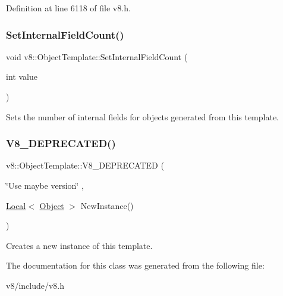 Definition at line 6118 of file v8.\+h.

\mbox{\label{classv8_1_1ObjectTemplate_ab63916ac584a76bca8ba541f86ce9fce}} 
\subsubsection{\texorpdfstring{Set\+Internal\+Field\+Count()}{SetInternalFieldCount()}}
{\footnotesize\ttfamily void v8\+::\+Object\+Template\+::\+Set\+Internal\+Field\+Count (\begin{DoxyParamCaption}\item[{int}]{value }\end{DoxyParamCaption})}

Sets the number of internal fields for objects generated from this template. \mbox{\label{classv8_1_1ObjectTemplate_ab13f4f7e5f31fc037f7a72cfbf89443d}} 
\subsubsection{\texorpdfstring{V8\+\_\+\+D\+E\+P\+R\+E\+C\+A\+T\+E\+D()}{V8\_DEPRECATED()}}
{\footnotesize\ttfamily v8\+::\+Object\+Template\+::\+V8\+\_\+\+D\+E\+P\+R\+E\+C\+A\+T\+ED (\begin{DoxyParamCaption}\item[{\char`\"{}Use maybe version\char`\"{}}]{,  }\item[{\mbox{\hyperlink{classv8_1_1Local}{Local}}$<$ \mbox{\hyperlink{classv8_1_1Object}{Object}} $>$ }]{New\+Instance() }\end{DoxyParamCaption})}

Creates a new instance of this template. 

The documentation for this class was generated from the following file\+:\begin{DoxyCompactItemize}
\item 
v8/include/v8.\+h\end{DoxyCompactItemize}
